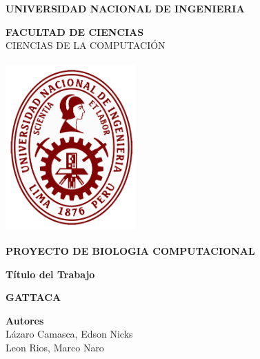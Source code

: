 \documentclass[a4paper]{article}
\begin{document}
\begin{titlepage}
\begin{center}
\vspace*{-0.4in}

{\fontsize{12}{30}\bf \selectfont UNIVERSIDAD NACIONAL DE INGENIERIA\\}

{\fontsize{12}{40}\bf \selectfont FACULTAD DE CIENCIAS\\}
\vspace*{0.15in} CIENCIAS DE LA COMPUTACI\'ON\\
\vspace*{0.2in}


\begin{center}
\includegraphics[width=5cm,height=6.5cm]{UNI.png}
\end{center}
\vspace*{0.2in}

\begin{large}
	{\bf PROYECTO DE BIOLOGIA COMPUTACIONAL\\}
	\vspace*{0.3in}
\end{large}

\begin{large}
{\bf T\'itulo del Trabajo\\}
\vspace*{0.2in}
\end{large}

\begin{Large}
\color{blue}
\textbf{GATTACA\\}
\color{black}
\end{Large}
\vspace*{0.2in}

\begin{large}
{\bf Autores} 
\vspace*{0.1in}
\\L\'azaro Camasca, Edson Nicks\\
Leon Rios, Marco Naro
\end{large}
\vspace*{0.4in}



\end{center}
\end{titlepage}
\end{document}
